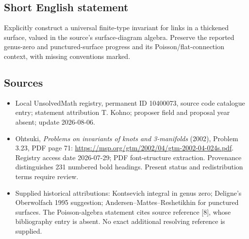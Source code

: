\documentclass[11pt]{article}
\begin{document}
\subsection{Short English statement}
Explicitly construct a universal finite-type invariant for links in a thickened surface, valued in the source's surface-diagram algebra. Preserve the reported genus-zero and punctured-surface progress and its Poisson/flat-connection context, with missing conventions marked.
\subsection{Sources}
\begin{itemize}
\item Local UnsolvedMath registry, permanent ID 10400073, source code catalogue entry; statement attribution T. Kohno; proposer field and proposal year absent; update 2026-08-06.
\item Ohtsuki, \emph{Problems on invariants of knots and 3-manifolds} (2002), Problem 3.23, PDF page 71: \url{https://msp.org/gtm/2002/04/gtm-2002-04-024s.pdf}. Registry access date 2026-07-29; PDF font-structure extraction. Provenance distinguishes 231 numbered bold headings. Present status and redistribution terms require review.
\item Supplied historical attributions: Kontsevich integral in genus zero; Deligne's Oberwolfach 1995 suggestion; Andersen--Mattes--Reshetikhin for punctured surfaces. The Poisson-algebra statement cites source reference [8], whose bibliography entry is absent. No exact additional resolving reference is supplied.
\end{itemize}
\end{document}
